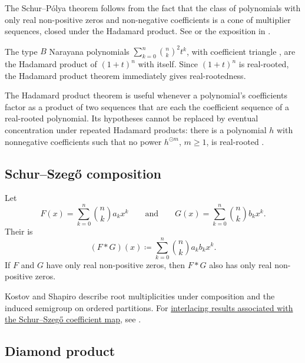 The Schur--Pólya theorem follows from the fact that the class of
polynomials with only real non-positive zeros and non-negative
coefficients is a cone of multiplier sequences, closed under the
Hadamard product.  See \cite{Karlin1968} or the exposition in
\cite{Branden2015}.

\begin{example*}
The type $B$ Narayana polynomials $\sum_{k=0}^n \binom{n}{k}^2 t^k$,
with coefficient triangle , are the Hadamard product of
$(1+t)^n$ with itself.
Since $(1+t)^n$ is real-rooted, the Hadamard product theorem
immediately gives real-rootedness.
\end{example*}

The Hadamard product theorem is useful whenever a polynomial's
coefficients factor as a product of two sequences that are each
the coefficient sequence of a real-rooted polynomial.
Its hypotheses cannot be replaced by eventual concentration under repeated
Hadamard products: there is a polynomial $h$ with nonnegative coefficients
such that no power $h^{\odot m}$, $m\geq1$, is real-rooted
\cite[Thm.~1.7]{BrandenFerroniJochemko2024x}.

\subsection[schurSzegoComposition]{Schur--Szeg\H{o} composition}

\begin{theorem}
Let
\[
  F(x)=\sum_{k=0}^n \binom{n}{k} a_k x^k
  \qquad\text{and}\qquad
  G(x)=\sum_{k=0}^n \binom{n}{k} b_k x^k.
\]
Their \label{schurSzegoCompositionDefinition}
is
\[
  (F*G)(x)
  \coloneqq
  \sum_{k=0}^n \binom{n}{k} a_k b_k x^k.
\]
If $F$ and $G$ have only real non-positive zeros, then $F*G$ also has
only real non-positive zeros.
\end{theorem}

Kostov and Shapiro \cite{KostovShapiro2006} describe root multiplicities
under composition and the induced semigroup on ordered partitions.
For \hyperref[schurSzegoInterlacing]{interlacing results associated with
the Schur--Szeg\H{o} coefficient map}, see \cite{Kostov2010}.

\subsection[diamondProduct]{Diamond product}


